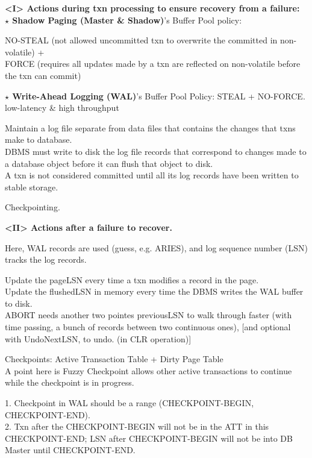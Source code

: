 \documentclass[letterpaper,11pt]{exam}
\begin{document}
\begin{spacing}{1.2}
  \textbf{<I> Actions during txn processing to ensure recovery from a failure:} \\
  \textbf{$\star$ Shadow Paging (Master \& Shadow)}'s Buffer Pool policy: 
  \begin{adjustwidth}{2em}{0pt}
  NO-STEAL (not allowed uncommitted txn to overwrite the committed in non-volatile) + \\
  FORCE (requires all updates made by a txn are reflected on non-volatile before the txn can commit)\\
  \end{adjustwidth}
  \textbf{$\star$ Write-Ahead Logging (WAL)}'s Buffer Pool Policy: STEAL + NO-FORCE. low-latency \& high throughput
  \begin{adjustwidth}{2em}{0pt}
  Maintain a log file separate from data files that contains the changes that txns make to database. \\
  DBMS must write to disk the log file records that correspond to changes made to a database object before it can flush that object to disk. \\
  A txn is not considered committed until all its log records have been written to stable storage.

  \begin{adjustwidth}{2em}{0pt}
    Checkpointing. \\
  \end{adjustwidth}
  \end{adjustwidth}

  \textbf{<II> Actions after a failure to recover.}

  Here, WAL records are used (guess, e.g. ARIES), and log sequence number (LSN) tracks the log records.
  \begin{adjustwidth}{2em}{0pt}
    Update the pageLSN every time a txn modifies a record in the page. \\
    Update the flushedLSN in memory every time the DBMS writes the WAL buffer to disk. \\  
    ABORT needs another two pointes previousLSN to walk through faster (with time passing, a bunch of records between two continuous ones), [and optional with UndoNextLSN, to undo. (in CLR operation)] \\
  \end{adjustwidth}

  Checkpoints: Active Transaction Table + Dirty Page Table \\
  A point here is Fuzzy Checkpoint allows other active transactions to continue while the checkpoint is in progress. \\
  \begin{adjustwidth}{2em}{0pt}
    1. Checkpoint in WAL should be a range (CHECKPOINT-BEGIN, CHECKPOINT-END). \\
    2. Txn after the CHECKPOINT-BEGIN will not be in the ATT in this CHECKPOINT-END; LSN after CHECKPOINT-BEGIN will not be into DB Master until CHECKPOINT-END. \\
  \end{adjustwidth}


\end{spacing}
\end{document}
